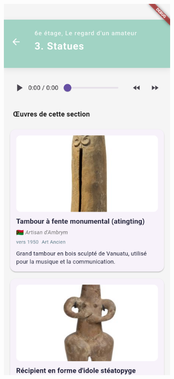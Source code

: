 \begin{figure}[h]
    \centering
    \begin{subfigure}[b]{0.33\linewidth}
        \includegraphics[width=\linewidth]{assets/application-area.png}

\end{subfigure}
\end{figure}
